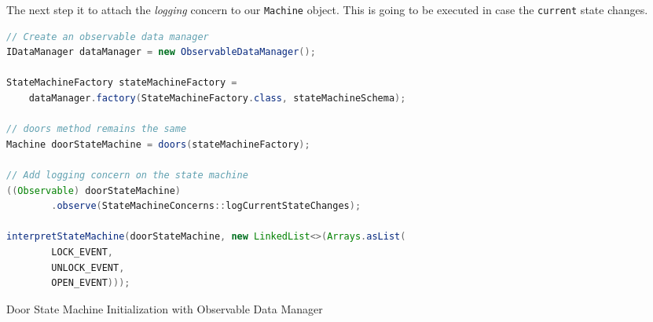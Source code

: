 The next step it to attach the \textit{logging} concern to our \texttt{Machine} object. 
This is going to be executed in case the \texttt{current} state changes.
\begin{sourcecode} [H]
	\begin{lstlisting}[language=Java, escapechar=|]
// Create an observable data manager
IDataManager dataManager = new ObservableDataManager();

StateMachineFactory stateMachineFactory =
	dataManager.factory(StateMachineFactory.class, stateMachineSchema);

// doors method remains the same
Machine doorStateMachine = doors(stateMachineFactory);

// Add logging concern on the state machine
((Observable) doorStateMachine)
		.observe(StateMachineConcerns::logCurrentStateChanges);

interpretStateMachine(doorStateMachine, new LinkedList<>(Arrays.asList(
		LOCK_EVENT,
		UNLOCK_EVENT,
		OPEN_EVENT)));
	\end{lstlisting}
	\caption{Door State Machine Initialization with Observable Data Manager}
	\label{lst:Door_state_machine_initialization_observable}
\end{sourcecode}





